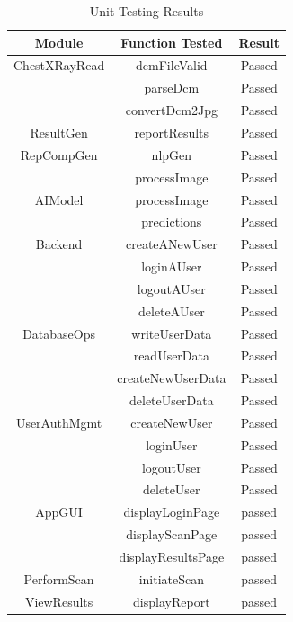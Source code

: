 \documentclass[12pt, titlepage]{article}
\begin{document}
\begin{table}[H]
  \centering
  \label{tab:unitTestingResults}
  \begin{tabular}{|c|c|c|}
    \hline
    \textbf{Module} & \textbf{Function Tested} & \textbf{Result} \\
    \hline
    ChestXRayRead & dcmFileValid & Passed \\
             & parseDcm & Passed \\
             & convertDcm2Jpg & Passed \\
    \hline
    ResultGen & reportResults & Passed \\      
    \hline
    RepCompGen & nlpGen & Passed \\
                & processImage & Passed \\
    \hline
    AIModel & processImage & Passed \\
            & predictions & Passed \\ 
    \hline
    Backend & createANewUser & Passed \\
            & loginAUser & Passed \\
            & logoutAUser & Passed \\
            & deleteAUser & Passed \\
    \hline
    DatabaseOps & writeUserData & Passed \\
                & readUserData & Passed \\
                & createNewUserData & Passed \\
                & deleteUserData & Passed \\
    \hline
    UserAuthMgmt & createNewUser & Passed \\
                 & loginUser & Passed \\
                 & logoutUser & Passed \\
                 & deleteUser & Passed \\
    \hline
    AppGUI & displayLoginPage & passed \\
            & displayScanPage & passed \\
            & displayResultsPage & passed \\
    \hline
    PerformScan & initiateScan & passed\\
    \hline
    ViewResults & displayReport & passed \\
    \hline
    
  \end{tabular}
  \caption{Unit Testing Results}
\end{table}
\end{document}
